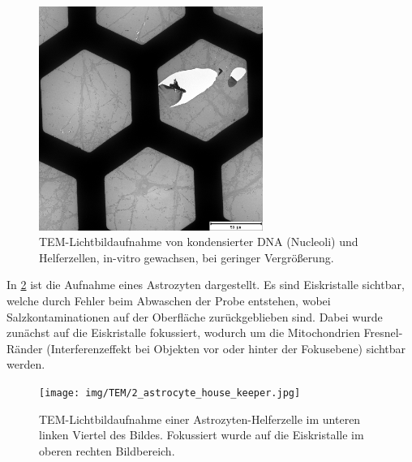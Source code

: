 \begin{figure}[!ht]
    \centering
    \includegraphics[width=0.65\textwidth]{img/TEM/1_low_mag_artifacts.jpg}
    \caption{TEM-Lichtbildaufnahme von kondensierter DNA (Nucleoli) und Helferzellen, in-vitro gewachsen, bei geringer Vergrößerung.} %
    \label{fig:tem:waben}
\end{figure}

In \cref{fig:tem:ahk} ist die Aufnahme eines Astrozyten dargestellt.
Es sind Eiskristalle sichtbar, welche durch Fehler beim Abwaschen der Probe entstehen, wobei Salzkontaminationen auf der Oberfläche zurückgeblieben sind.
Dabei wurde zunächst auf die Eiskristalle fokussiert, wodurch um die Mitochondrien Fresnel-Ränder (Interferenzeffekt bei Objekten vor oder hinter der Fokusebene) sichtbar werden.

\begin{figure}[!ht]
    \centering
    \texttt{[image: img/TEM/2\_astrocyte\_house\_keeper.jpg]}
    \caption{TEM-Lichtbildaufnahme einer Astrozyten-Helferzelle im unteren linken Viertel des Bildes. Fokussiert wurde auf die Eiskristalle im oberen rechten Bildbereich.}
    \label{fig:tem:ahk}
\end{figure}
